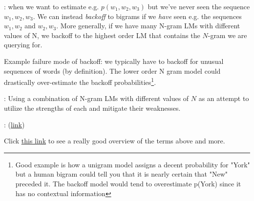 \documentclass[11pt]{article}
\begin{document}
\begin{compactitem}
	\item {}: when we want to estimate e.g. $p(w_1, w_2, w_3)$ but we've never seen the sequence $w_1, w_2, w_3$. We can instead \textit{backoff} to bigrams if we \textit{have} seen e.g. the sequences $w_1, w_2$ and $w_2, w_3$. More generally, if we have many N-gram LMs with different values of N, we backoff to the highest order LM that contains the $N$-gram we are querying for.
	\begin{compactitem}
		\item Example failure mode of backoff: we typically have to backoff for unusual sequences of words (by definition). The lower order N gram model could drastically over-estimate the backoff probabilities\footnote{Good example is how a unigram model assigns a decent probability for "York" but a human bigram could tell you that it is nearly certain that "New" preceded it. The backoff model would tend to overestimate p(York) since it has no contextual information}.
	\end{compactitem}
	
	\item {}: Using a combination of N-gram LMs with different values of $N$ as an attempt to utilize the strengths of each and mitigate their weaknesses.
	
	\item {}: (\href{http://www.foldl.me/2014/kneser-ney-smoothing/}{link})
\end{compactitem}
Click \href{https://www.statmt.org/book/slides/07-language-models.pdf}{this link} to see a really good overview of the terms above and more.
\end{document}
